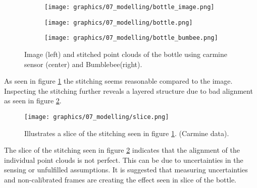 \begin{figure}[htb]
	\centering
        \begin{subfigure}[b]{0.3\textwidth}
        \begin{center}
			\texttt{[image: graphics/07\_modelling/bottle\_image.png]}
			\end{center}
        \end{subfigure}
        \begin{subfigure}[b]{0.3\textwidth}
        \begin{center}
			\texttt{[image: graphics/07\_modelling/bottle.png]}
			\end{center}
        \end{subfigure} 
        \begin{subfigure}[b]{0.3\textwidth}
        \begin{center}
			\texttt{[image: graphics/07\_modelling/bottle\_bumbee.png]}
			\end{center}
        \end{subfigure}  
		\caption{Image (left) and stitched point clouds of the bottle using carmine sensor (center) and Bumblebee(right).}\label{fig:bottle}
\end{figure}

\noindent As seen in figure \ref{fig:bottle} the stitching seems reasonable compared to the image. Inspecting the stitching further reveals a layered structure due to bad alignment as seen in figure \ref{fig:bottle_slice}.

\begin{figure}[htb]
	\begin{center}
		\texttt{[image: graphics/07\_modelling/slice.png]}%
		\caption{Illustrates a slice of the stitching seen in figure \ref{fig:bottle}. (Carmine data).}
		\label{fig:bottle_slice}
	\end{center}
\end{figure}

\noindent The slice of the stitching seen in figure \ref{fig:bottle_slice} indicates that the alignment of the individual point clouds is not perfect. This can be due to uncertainties in the sensing or unfulfilled assumptions. It is suggested that measuring uncertainties and non-calibrated frames are creating the effect seen in slice of the bottle.\\